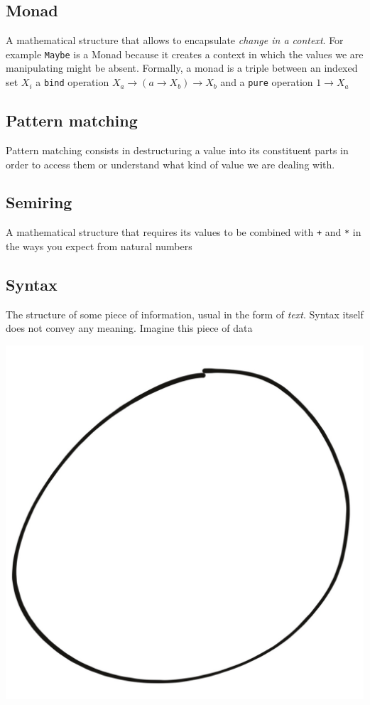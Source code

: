 \documentclass[
]{article}
\begin{document}
\hypertarget{monad}{%
\subsection{Monad}\label{monad}}

A mathematical structure that allows to encapsulate \emph{change in a
context}. For example \texttt{Maybe} is a Monad because it creates a
context in which the values we are manipulating might be absent.
Formally, a monad is a triple between an indexed set \(X_i\) a
\texttt{bind} operation \(X_a \to (a \to X_b) \to X_b\) and a
\texttt{pure} operation \(1 \to X_a\)

\hypertarget{pattern-matching-1}{%
\subsection{Pattern matching}\label{pattern-matching-1}}

Pattern matching consists in destructuring a value into its constituent
parts in order to access them or understand what kind of value we are
dealing with.

\hypertarget{semiring}{%
\subsection{Semiring}\label{semiring}}

A mathematical structure that requires its values to be combined with
\texttt{+} and \texttt{*} in the ways you expect from natural numbers

\hypertarget{syntax-1}{%
\subsection{Syntax}\label{syntax-1}}

The structure of some piece of information, usual in the form of
\emph{text}. Syntax itself does not convey any meaning. Imagine this
piece of data

\includegraphics{Zero.jpg}
\end{document}
